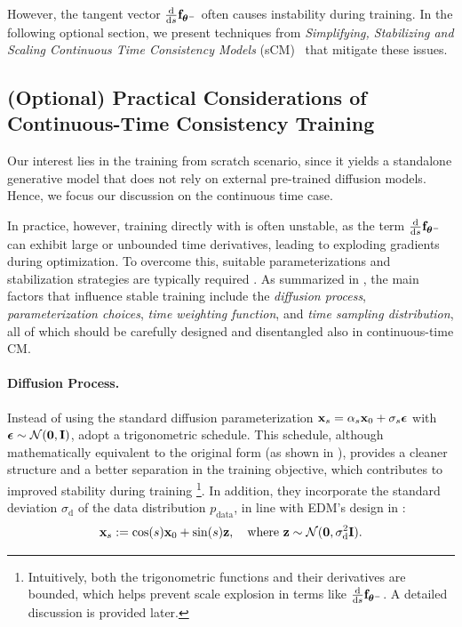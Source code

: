 However, the tangent vector 
$\tfrac{\mathop{}\!\mathrm{d} }{\mathop{}\!\mathrm{d} s}{\mathbf{f}}_{\bm{\theta}^-}$ 
often causes instability during training. 
In the following optional section, we present techniques from 
\emph{Simplifying, Stabilizing and Scaling Continuous Time Consistency Models} 
(sCM)~\citep{lu2024simplifying} that mitigate these issues.





\subsection{(Optional) Practical Considerations of Continuous-Time Consistency Training} 
Our interest lies in the training from scratch scenario, since it yields a
standalone generative model that does not rely on external pre-trained diffusion
models. Hence, we focus our discussion on the continuous time case.

In practice, however, training directly with  is often unstable, 
as the term $\tfrac{\mathop{}\!\mathrm{d}}{\mathop{}\!\mathrm{d} s}{\mathbf{f}}_{\bm{\theta}^-}$ can exhibit large or unbounded time derivatives, 
leading to exploding gradients during optimization. To overcome this, suitable
parameterizations and stabilization strategies are typically required
\citep{geng2025consistency,lu2024simplifying}. As summarized in
, the main factors that influence stable
training include the \emph{diffusion process}, \emph{parameterization choices},
\emph{time weighting function}, and \emph{time sampling distribution}, all of
which should be carefully designed and disentangled also in continuous-time CM.




\paragraph{Diffusion Process.}  Instead of using the standard diffusion parameterization 
${\mathbf{x}}_s = \alpha_s {\mathbf{x}}_0 + \sigma_s \bm{\epsilon}$ with 
$\bm{\epsilon} \sim \mathcal{N}(\bm{0}, {\mathbf{I}})$, 
\citet{lu2024simplifying} adopt a trigonometric schedule. 
This schedule, although mathematically equivalent to the original form 
(as shown in ), provides a cleaner structure and a better 
separation in the training objective, which contributes to improved stability 
during training
\footnote{Intuitively, both the trigonometric functions and their derivatives are bounded, which helps prevent scale explosion in terms like $\frac{\mathop{}\!\mathrm{d}}{\mathop{}\!\mathrm{d} s} {\mathbf{f}}_{\bm{\theta}^-}$. A detailed discussion is provided later.
}. In addition, they incorporate the standard deviation $\sigma_{\mathrm{d}}$ of the data distribution $p_{\mathrm{data}}$, in line with EDM’s design in :
\begin{align}\label{eq:trig-scm}
    {\mathbf{x}}_s := \cos(s) {\mathbf{x}}_0 + \sin(s) {\mathbf{z}}, \quad \text{where } {\mathbf{z}} \sim \mathcal{N}(\bm{0}, \sigma_{\mathrm{d}}^2 {\mathbf{I}}).
\end{align}

